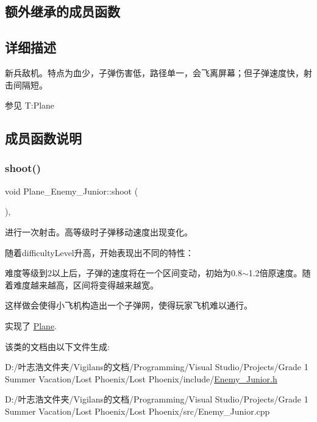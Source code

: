 \subsection*{额外继承的成员函数}


\subsection{详细描述}
新兵敌机。特点为血少，子弹伤害低，路径单一，会飞离屏幕；但子弹速度快，射击间隔短。 

\begin{DoxySeeAlso}{参见}
T\+:\+Plane


\end{DoxySeeAlso}


\subsection{成员函数说明}
\mbox{\label{class_plane___enemy___junior_a5ffc4150cdf4c6e81480a2977d4bfafe}} 
\subsubsection{\texorpdfstring{shoot()}{shoot()}}
{\footnotesize\ttfamily void Plane\+\_\+\+Enemy\+\_\+\+Junior\+::shoot (\begin{DoxyParamCaption}{ }\end{DoxyParamCaption})\hspace{0.3cm}{\ttfamily [override]}, {\ttfamily [virtual]}}



进行一次射击。高等级时子弹移动速度出现变化。 

随着difficulty\+Level升高，开始表现出不同的特性：
\begin{DoxyItemize}
\item 难度等级到2以上后，子弹的速度将在一个区间变动，初始为0.8$\sim$1.2倍原速度。随着难度越来越高，区间将变得越来越宽。
\item 这样做会使得小飞机构造出一个子弹网，使得玩家飞机难以通行。 
\end{DoxyItemize}

实现了 \hyperlink{class_plane}{Plane}.



该类的文档由以下文件生成\+:\begin{DoxyCompactItemize}
\item 
D\+:/叶志浩文件夹/\+Vigilans的文档/\+Programming/\+Visual Studio/\+Projects/\+Grade 1 Summer Vacation/\+Lost Phoenix/\+Lost Phoenix/include/\hyperlink{_enemy___junior_8h}{Enemy\+\_\+\+Junior.\+h}\item 
D\+:/叶志浩文件夹/\+Vigilans的文档/\+Programming/\+Visual Studio/\+Projects/\+Grade 1 Summer Vacation/\+Lost Phoenix/\+Lost Phoenix/src/Enemy\+\_\+\+Junior.\+cpp\end{DoxyCompactItemize}
